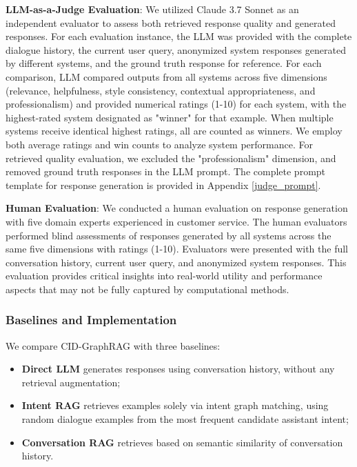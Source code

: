 \documentclass[
]{style/ceurart}
\begin{document}
\textbf{LLM-as-a-Judge Evaluation}: We utilized Claude 3.7 Sonnet \citep{sonnet_aws} as an independent evaluator to assess both retrieved response quality and generated responses. For each evaluation instance, the LLM was provided with the complete dialogue history, the current user query, anonymized system responses generated by different systems, and the ground truth response for reference. For each comparison, LLM compared outputs from all systems across five dimensions (relevance, helpfulness, style consistency, contextual appropriateness, and professionalism) and provided numerical ratings (1-10) for each system, with the highest-rated system designated as "winner" for that example. When multiple systems receive identical highest ratings, all are counted as winners. We employ both average ratings and win counts to analyze system performance. For retrieved quality evaluation, we excluded the "professionalism" dimension, and removed ground truth responses in the LLM prompt. The complete prompt template for response generation is provided in Appendix \ref{judge_prompt}.

\textbf{Human Evaluation}: We conducted a human evaluation on response generation with five domain experts experienced in customer service. The human evaluators performed blind assessments of responses generated by all systems across the same five dimensions with ratings (1-10). Evaluators were presented with the full conversation history, current user query, and anonymized system responses. This evaluation provides critical insights into real-world utility and performance aspects that may not be fully captured by computational methods.

\subsubsection {Baselines and Implementation}  
We compare CID-GraphRAG with three baselines:
\begin{itemize}
    \item \textbf{Direct LLM} generates responses using conversation history, without any retrieval augmentation;
    \item \textbf{Intent RAG} retrieves examples solely via intent graph matching, using random dialogue examples from the most frequent candidate assistant intent;
    \item \textbf{Conversation RAG} retrieves based on semantic similarity of conversation history.
\end{itemize}
\end{document}
